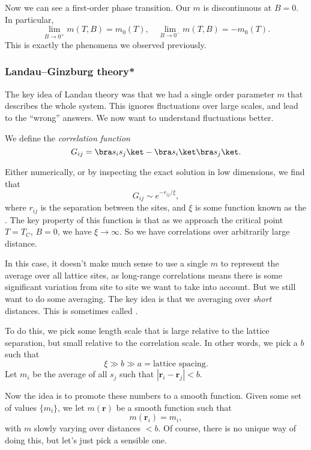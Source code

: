 \documentclass[a4paper]{article}
\begin{document}
Now we can see a first-order phase transition. Our $m$ is discontinuous at $B = 0$. In particular,
\[
  \lim_{B \to 0^+} m(T, B) = m_0(T),\quad \lim_{B \to 0^-} m(T, B) = -m_0(T).
\]
This is exactly the phenomena we observed previously.

\subsubsection*{Landau--Ginzburg theory*}
The key idea of Landau theory was that we had a single order parameter $m$ that describes the whole system. This ignores fluctuations over large scales, and lead to the ``wrong'' answers. We now want to understand fluctuations better.

\begin{defi}
  We define the \emph{correlation function}
  \[
    G_{ij} = \bra s_i s_j\ket - \bra s_i \ket\bra s_j\ket.
  \]
\end{defi}
Either numerically, or by inspecting the exact solution in low dimensions, we find that
\[
  G_{ij} \sim e^{-r_{ij}/\xi},
\]
where $r_{ij}$ is the separation between the sites, and $\xi$ is some function known as the . The key property of this function is that as we approach the critical point $T = T_C$, $B = 0$, we have $\xi \to \infty$. So we have correlations over arbitrarily large distance.

In this case, it doesn't make much sense to use a single $m$ to represent the average over all lattice sites, as long-range correlations means there is some significant variation from site to site we want to take into account. But we still want to do some averaging. The key idea is that we averaging over \emph{short} distances. This is sometimes called .

To do this, we pick some length scale that is large relative to the lattice separation, but small relative to the correlation scale. In other words, we pick a $b$ such that
\[
  \xi \gg b \gg a = \text{lattice spacing}.
\]
Let $m_i$ be the average of all $s_j$ such that $|\mathbf{r}_i - \mathbf{r}_j| < b$.

Now the idea is to promote these numbers to a smooth function. Given some set of values $\{m_i\}$, we let $m(\mathbf{r})$ be a smooth function such that
\[
  m(\mathbf{r}_i) = m_i,
\]
with $m$ slowly varying over distances $ < b$. Of course, there is no unique way of doing this, but let's just pick a sensible one.
\end{document}
